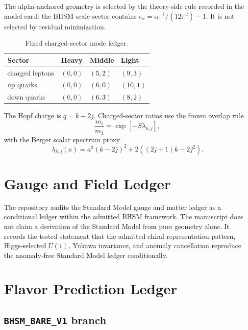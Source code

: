 \documentclass[11pt]{article}
\newcommand{\BHSM}{BHSM}
\newcommand{\Bare}{\texttt{BHSM\_BARE\_V1}}
\begin{document}
The alpha-anchored geometry is selected by the theory-side rule recorded in the
model card: the \BHSM{} scale sector contains
$\epsilon_\alpha=\alpha^{-1}/(12\pi^2)-1$. It is not selected by residual
minimization.

\begin{table}[htbp]
\centering
\caption{Fixed charged-sector mode ledger.}
\begin{tabular}{@{}llll@{}}
\toprule
Sector & Heavy & Middle & Light \\
\midrule
charged leptons & $(0,0)$ & $(5,2)$ & $(9,3)$ \\
up quarks & $(0,0)$ & $(6,0)$ & $(10,1)$ \\
down quarks & $(0,0)$ & $(6,3)$ & $(8,2)$ \\
\bottomrule
\end{tabular}
\end{table}

The Hopf charge is $q=k-2j$. Charged-sector ratios use the frozen overlap rule
\[
  \frac{m_i}{m_3}=\exp[-S\lambda_{k,j}],
\]
with the Berger scalar spectrum proxy
\[
  \lambda_{k,j}(a)=a^2(k-2j)^2+2((2j+1)k-2j^2).
\]

\section{Gauge and Field Ledger}

The repository audits the Standard Model gauge and matter ledger as a
conditional ledger within the admitted \BHSM{} framework. The manuscript does
not claim a derivation of the Standard Model from pure geometry alone. It
records the tested statement that the admitted chiral representation pattern,
Higgs-selected $U(1)$, Yukawa invariance, and anomaly cancellation reproduce
the anomaly-free Standard Model ledger conditionally.

\section{Flavor Prediction Ledger}

\subsection{\Bare{} branch}
\end{document}
